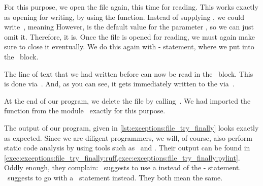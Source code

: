 For this purpose, we open the file again, this time for reading.
This works exactly as opening for writing, by using the  function.
Instead of supplying , we could write~, meaning 
However,  is the default value for the parameter , so we can just omit it.
Therefore,  it is.
Once the file is opened for reading, we must again make sure to close it eventually.
We do this again with - statement, where we put  into the ~block.

The line of text that we had written before can now be read in the ~block.
This is done via~.
And, as you can see, it gets immediately written to the  via~.

At the end of our program, we delete the file  by calling~.
We had imported the  function from the module~ exactly for this purpose.

The output of our program, given in \cref{lst:exceptions:file_try_finally} looks exactly as expected.
Since we are diligent programmers, we will, of course, also perform static code analysis by using tools such as \ruff\ and \pylint.
Their output can be found in \cref{exec:exceptions:file_try_finally:ruff,exec:exceptions:file_try_finally:pylint}.
Oddly enough, they complain:
\ruff\ suggests to use a  instead of the - statement.
\pylint\ suggests to go with a ~statement instead.
They both mean the same.

